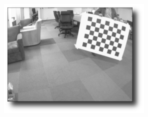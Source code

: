 \begin{figure}[!htb]
  \includegraphics[width=\linewidth]{Imagens/figura3-16.png}
\endminipage
\end{figure}

